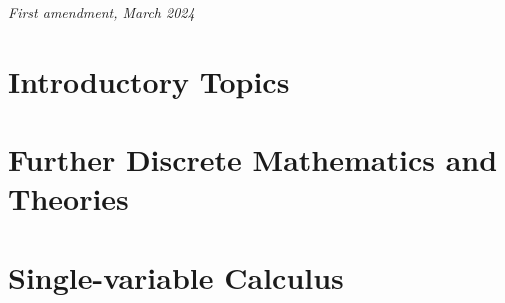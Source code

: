 \documentclass[
	12pt, %
	fleqn, %
	a4paper, %
]{LegrandOrangeBook}
\theoremstyle{lemmastyle}
\theoremstyle{solutionStyle}
\begin{document}
\noindent \textit{First amendment, March 2024} %


\pagestyle{empty} %

\tableofcontents %

\listoffigures %

\listoftables %

\pagestyle{fancy} %

\cleardoublepage %


\part{Introductory Topics}






\part{Further Discrete Mathematics and Theories}






\part{Single-variable Calculus}







\end{document}
